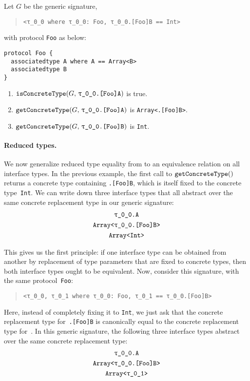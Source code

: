 \documentclass[../generics]{subfiles}
\begin{document}
\begin{example}\label{concrete type query example}
Let $G$ be the generic signature,
\begin{quote}
\begin{verbatim}
<τ_0_0 where τ_0_0: Foo, τ_0_0.[Foo]B == Int>
\end{verbatim}
\end{quote}
with protocol \texttt{Foo} as below:
\begin{Verbatim}
protocol Foo {
  associatedtype A where A == Array<B>
  associatedtype B
}
\end{Verbatim}
\begin{enumerate}
\item $\Query{isConcreteType}{G,\,\texttt{\rT.[Foo]A}}$ is true.
\item $\Query{getConcreteType}{G,\,\texttt{\rT.[Foo]A}}$ is \texttt{Array<\rT.[Foo]B>}.
\item $\Query{getConcreteType}{G,\,\texttt{\rT.[Foo]B}}$ is \texttt{Int}.
\end{enumerate}
\end{example}

\paragraph{Reduced types.} We now generalize reduced type equality from  to an equivalence relation on all interface types. In the previous example, the first call to $\texttt{getConcreteType}()$ returns a concrete type containing \texttt{\rT.[Foo]B}, which is itself fixed to the concrete type~\texttt{Int}. We can write down three interface types that all abstract over the same concrete replacement type in our generic signature:
\begin{gather*}
\texttt{\rT.A}\\
\texttt{Array<\rT.[Foo]B>}\\
\texttt{Array<Int>}
\end{gather*}

This gives us the first principle: if one interface type can be obtained from another by replacement of type parameters that are fixed to concrete types, then both interface types ought to be equivalent. Now, consider this signature, with the same protocol~\texttt{Foo}:
\begin{quote}
\begin{verbatim}
<τ_0_0, τ_0_1 where τ_0_0: Foo, τ_0_1 == τ_0_0.[Foo]B>
\end{verbatim}
\end{quote}
Here, instead of completely fixing it to \texttt{Int}, we just ask that the concrete replacement type for~\texttt{\rT.[Foo]B} is canonically equal to the concrete replacement type for~\rU. In this generic signature, the following three interface types abstract over the same concrete replacement type:
\begin{gather*}
\texttt{\rT.A}\\
\texttt{Array<\rT.[Foo]B>}\\
\texttt{Array<\rU>}
\end{gather*}
\end{document}
